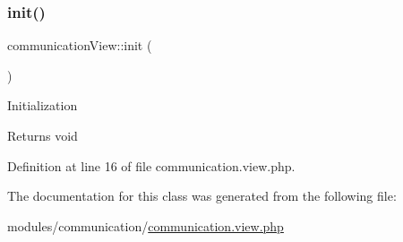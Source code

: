 \mbox{\label{classcommunicationView_abf9303274b2b073771fa7564247b160c}} 
\subsubsection{\texorpdfstring{init()}{init()}}
{\footnotesize\ttfamily communication\+View\+::init (\begin{DoxyParamCaption}{ }\end{DoxyParamCaption})}

Initialization \begin{DoxyReturn}{Returns}
void 
\end{DoxyReturn}


Definition at line 16 of file communication.\+view.\+php.



The documentation for this class was generated from the following file\+:\begin{DoxyCompactItemize}
\item 
modules/communication/\hyperlink{communication_8view_8php}{communication.\+view.\+php}\end{DoxyCompactItemize}
